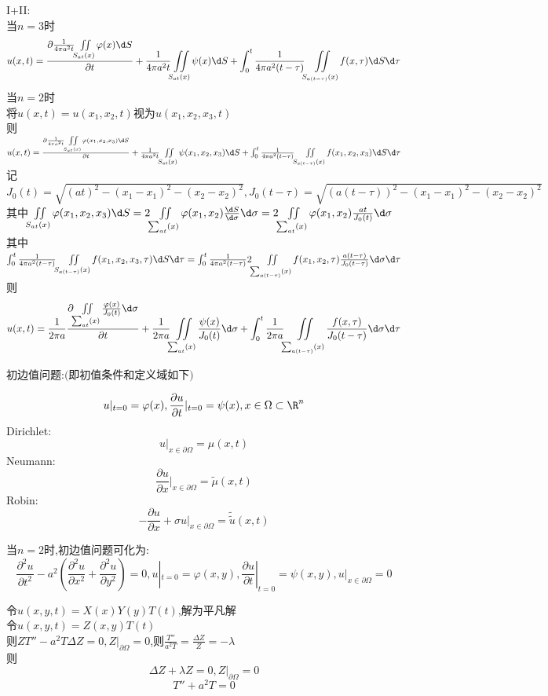 I+II:\\
当$n=3$时\\
\[u(x,t)=\frac{\partial \frac{1}{4\pi a^2t}\iint\limits_{S_{at}(x)}\varphi(x)\d S}{\partial t}+\frac{1}{4\pi a^2t}\iint\limits_{S_{at}(x)}\psi(x)\d S+\int_{0}^{t}\frac{1}{4\pi a^2(t-\tau)}\iint\limits_{S_{a(t-\tau)}(x)}f(x,\tau)\d S\d \tau\]
当$n=2$时\\
将$u(x,t)=u(x_1,x_2,t)$视为$u(x_1,x_2,x_3,t)$\\
则$u(x,t)=\frac{\partial \frac{1}{4\pi a^2t}\iint\limits_{S_{at}(x)}\varphi(x_1,x_2,x_3)\d S}{\partial t}+\frac{1}{4\pi a^2t}\iint\limits_{S_{at}(x)}\psi(x_1,x_2,x_3)\d S+\int_{0}^{t}\frac{1}{4\pi a^2(t-\tau)}\iint\limits_{S_{a(t-\tau)}(x)}f(x_1,x_2,x_3)\d S\d \tau$\\
记$J_0(t)=\sqrt{(at)^2-(x_1-x_1)^2-(x_2-x_2)^2},J_0(t-\tau)=\sqrt{(a(t-\tau))^2-(x_1-x_1)^2-(x_2-x_2)^2}$
其中$\iint\limits_{S_{at}(x)}\varphi(x_1,x_2,x_3)\d S=2\iint\limits_{\sum_{at}(x)}\varphi(x_1,x_2)\frac{\d S}{\d\sigma}\d\sigma=2\iint\limits_{\sum_{at}(x)}\varphi(x_1,x_2)\frac{at}{J_0(t)}\d\sigma$\\
其中$\int_{0}^{t}\frac{1}{4\pi a^2(t-\tau)}\iint\limits_{S_{a(t-\tau)}(x)}f(x_1,x_2,x_3,\tau)\d S\d \tau=\int_{0}^{t}\frac{1}{4\pi a^2(t-\tau)}2\iint\limits_{\sum_{a(t-\tau)}(x)}f(x_1,x_2,\tau)\frac{a(t-\tau)}{J_0(t-\tau)}\d \sigma\d \tau$\\
则\[u(x,t)=\frac{1}{2\pi a}\frac{\partial\iint\limits_{\sum_{at}(x)}\frac{\varphi(x)}{J_0(t)}\d \sigma}{\partial t}+\frac{1}{2\pi a}\iint\limits_{\sum_{at}(x)}\frac{\psi(x)}{J_0(t)}\d\sigma+\int_{0}^{t}\frac{1}{2\pi a}\iint\limits_{\sum_{a(t-\tau)}(x)}\frac{f(x,\tau)}{J_0(t-\tau)}\d \sigma\d \tau\]

初边值问题:$($即初值条件和定义域如下$)$

\[u|_{t=0}=\varphi(x),\frac{\partial u}{\partial t}|_{t=0}=\psi(x),x\in\Omega\subset\R^n\]
Dirichlet:
\[u|_{x\in\partial\Omega}=\mu(x,t)\] 
Neumann:
\[\frac{\partial u}{\partial x}|_{x\in\partial\Omega}=\widetilde{\mu}(x,t)\] 
Robin:
\[-\frac{\partial u}{\partial x}+\sigma u|_{x\in\partial\Omega}=\widetilde{\widetilde{u}}(x,t)\] 

当$n=2$时,初边值问题可化为:\\
\[\frac{\partial ^2 u}{\partial t^2}-a^2(\frac{\partial ^2 u}{\partial x^2}+\frac{\partial^2 u}{\partial y^2})=0,u|_{t=0}=\varphi(x,y),\frac{\partial u}{\partial t}|_{t=0}=\psi(x,y),u|_{x\in\partial\Omega}=0\]

\begin{jie}
令$u(x,y,t)=X(x)Y(y)T(t)$,解为平凡解\\
令$u(x,y,t)=Z(x,y)T(t)$\\
则$ZT''-a^2T\Delta Z=0,Z|_{\partial \Omega}=0$,则$\frac{T''}{a^2T}=\frac{\Delta Z}{Z}=-\lambda$\\
则
\[\Delta Z+\lambda Z=0,Z|_{\partial \Omega}=0\]
\[T''+a^2T=0\]
\end{jie}

